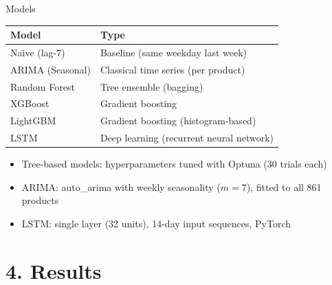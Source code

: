 \documentclass[aspectratio=169]{beamer}
\begin{document}
\begin{frame}{Models}
\begin{table}
\centering
\small
\begin{tabular}{ll}
\toprule
\textbf{Model} & \textbf{Type} \\
\midrule
Naive (lag-7) & Baseline (same weekday last week) \\
ARIMA (Seasonal) & Classical time series (per product) \\
Random Forest & Tree ensemble (bagging) \\
XGBoost & Gradient boosting \\
LightGBM & Gradient boosting (histogram-based) \\
LSTM & Deep learning (recurrent neural network) \\
\bottomrule
\end{tabular}
\end{table}
\vfill
\begin{itemize}
    \item Tree-based models: hyperparameters tuned with Optuna (30 trials each)
    \item ARIMA: auto\_arima with weekly seasonality ($m=7$), fitted to all 861 products
    \item LSTM: single layer (32 units), 14-day input sequences, PyTorch
\end{itemize}
\end{frame}

\section{4. Results}
\end{document}
